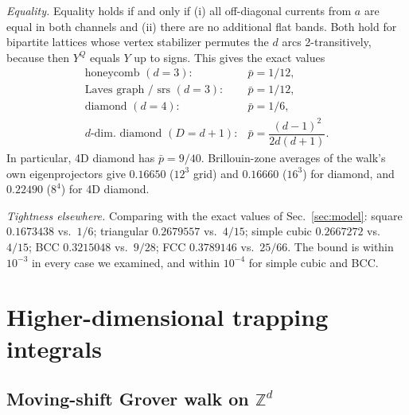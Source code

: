 \documentclass[aps,pra,10pt,twocolumn,superscriptaddress,nofootinbib]{revtex4-2}
\newcommand{\pbar}{\bar{p}}
\newcommand{\YQ}{Y^{Q}}
\begin{document}
\emph{Equality.} Equality holds if and only if (i) all off-diagonal currents from $a$ are equal
in both channels and (ii) there are no additional flat bands. Both hold for bipartite
lattices whose vertex stabilizer permutes the $d$ arcs 2-transitively, because then $\YQ$
equals $Y$ up to signs. This gives the exact values
\begin{equation}
\begin{array}{ll}
\text{honeycomb }(d=3): & \pbar=1/12,\\
\text{Laves graph / srs }(d=3): & \pbar=1/12,\\
\text{diamond }(d=4): & \pbar=1/6,\\
d\text{-dim.\ diamond }(D=d+1): & \pbar=\dfrac{(d-1)^2}{2d(d+1)}.
\end{array}
\end{equation}
In particular, 4D diamond has $\pbar=9/40$. Brillouin-zone averages of the walk's own eigenprojectors
give $0.16650$ ($12^3$ grid) and $0.16660$ ($16^3$) for diamond, and $0.22490$ ($8^4$) for 4D diamond.

\emph{Tightness elsewhere.} Comparing with the exact values of Sec.~\ref{sec:model}:
square $0.1673438$ vs.\ $1/6$; triangular $0.2679557$ vs.\ $4/15$;
simple cubic $0.2667272$ vs.\ $4/15$; BCC $0.3215048$ vs.\ $9/28$;
FCC $0.3789146$ vs.\ $25/66$. The bound is within $10^{-3}$ in every case we examined,
and within $10^{-4}$ for simple cubic and BCC.

\section{Higher-dimensional trapping integrals}
\label{sec:higherd}

\subsection{Moving-shift Grover walk on $\mathbb{Z}^d$}
\end{document}

